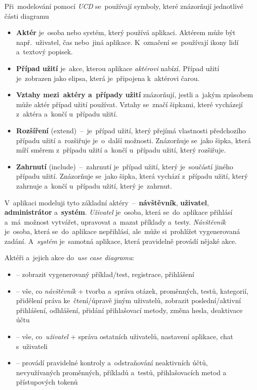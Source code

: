 \documentclass[11pt,a4paper]{report}
\newcommand{\harddata}[1]{\boxed{\texttt{#1}}}
\begin{document}
                Při~modelování pomocí \emph{UCD} se~používají symboly, které znázorňují jednotlivé části diagramu
                \begin{itemize}
                    \item \textbf{Aktér} je~osoba nebo systém, který používá aplikaci. Aktérem může být např.~uživatel, čas nebo~jiná aplikace. K~označení se~používají ikony lidí a~textový popisek.
                    \item \textbf{Případ užití} je~akce, kterou aplikace \emph{aktérovi} nabízí. Případ užití je~zobrazen jako elipsa, která je~připojena k~aktérovi čarou.
                    \item \textbf{Vztahy mezi~aktéry a~případy užití} znázorňují, jestli a~jakým způsobem může aktér případ užití používat. Vztahy se~značí šipkami, které vycházejí z~aktéra a~končí u~případu užití.
                    \item \textbf{Rozšíření} (extend)~--~je~případ užití, který přejímá vlastnosti předchozího případu užití a~rozšiřuje je~o~další možnosti. Znázorňuje se~jako šipka, která míří směrem z~případu užití a~končí u~případu užití, který rozšiřuje.
                    \item \textbf{Zahrnutí} (include)~--~zahrnutí je~případ užití, který je~součástí jiného případu užití. Znázorňuje se~jako šipka, která vychází z~případu užití, který zahrnuje a~končí u~případu užití, který je~zahrnut.
                \end{itemize}

                V~aplikaci modeluji tyto základní aktéry~--~\textbf{návštěvník}, \textbf{uživatel}, \textbf{administrátor} a~\textbf{systém}. \emph{Uživatel} je~osoba, která se~do~aplikace přihlásí a~má~možnost vytvářet, upravovat a~mazat příklady a~testy. \emph{Návštěvník} je~osoba, která se~do~aplikace nepřihlásí, ale~může si~prohlížet vygenerovaná zadání. A~\emph{systém} je~samotná aplikace, která pravidelně provádí nějaké akce.

                Aktéři a~jejich akce do~\emph{use case diagramu}:

                \begin{itemize}
                    \item \harddata{Návštěvník} -- zobrazit vygenerovaný příklad/test, registrace, přihlášení
                    \item \harddata{Uživatel} -- vše, co \emph{návštěvník} + tvorba a~správa otázek, proměnných, testů, kategorií, přidělení práva ke~čtení/úpravě jiným uživatelů, zobrazit poslední/aktivní přihlášení, odhlášení, přidání přihlašovací metody, změna hesla, deaktivace účtu
                    \item \harddata{Administrátor} -- vše, co~\emph{uživatel} + správa ostatních uživatelů, nastavení aplikace, chat s~uživateli
                    \item \harddata{Systém} -- provádí pravidelné kontroly a~odstraňování neaktivních účtů, nevyužívaných proměnných, příkladů a~testů, přihlašovacích metod a přístupových tokenů
                \end{itemize}
\end{document}
